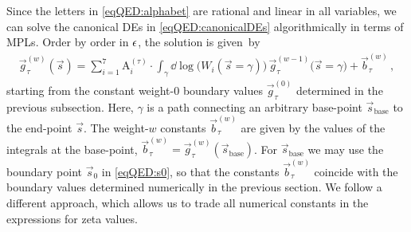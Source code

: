 \documentclass[main.tex]{subfiles}
\begin{document}
Since the letters in \cref{eqQED:alphabet} are rational and linear in all variables, we can solve the canonical \acp{DE} in \cref{eqQED:canonicalDEs} algorithmically in terms of \acp{MPL}. Order by order in $\epsilon$, the solution is given~by
\begin{align} \label{eqQED:solution}
\vec{g}^{(w)}_{\tau}(\vec{s}) = \sum_{i=1}^7 \mathrm{A}_i^{(\tau)} \cdot \int_{\gamma} \dd \log \bigl(W_i(\vec{s}=\gamma) \bigr) \, \vec{g}^{(w-1)}_{\tau}\bigl(\vec{s}=\gamma\bigr) + \vec{b}^{(w)}_{\tau} \,,
\end{align}
starting from the constant weight-$0$ boundary values $\vec{g}^{(0)}_{\tau}$ determined in the previous subsection. Here, $\gamma$ is a path connecting an arbitrary base-point $\vec{s}_{\mathrm{base}}$ to the end-point $\vec{s}$. The weight-$w$ constants $\vec{b}^{(w)}_{\tau} $ are given by the values of the integrals at the base-point, $ \vec{b}^{(w)}_{\tau} = \vec{g}^{(w)}_{\tau}(\vec{s}_{\mathrm{base}})$.
For $\vec{s}_{\mathrm{base}}$ we may use the boundary point $\vec{s}_0$ in \cref{eqQED:s0}, so that the constants $\vec{b}^{(w)}_{\tau}$ coincide with the boundary values determined numerically in the previous section. We follow a different approach, which allows us to trade all numerical constants in the expressions for zeta values.
\end{document}
